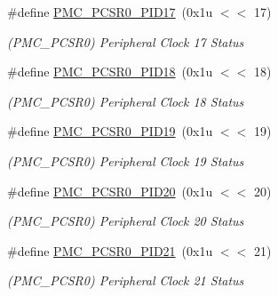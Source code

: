 \begin{DoxyCompactItemize}
\mbox{\label{group__SAME70__PMC_ga5f42d67ad6601e60109af27d2eb91f2f}} 
\#define \mbox{\hyperlink{group__SAME70__PMC_ga5f42d67ad6601e60109af27d2eb91f2f}{P\+M\+C\+\_\+\+P\+C\+S\+R0\+\_\+\+P\+I\+D17}}~(0x1u $<$$<$ 17)
\begin{DoxyCompactList}\small\item\em (P\+M\+C\+\_\+\+P\+C\+S\+R0) Peripheral Clock 17 Status \end{DoxyCompactList}\item 
\mbox{\label{group__SAME70__PMC_ga703eff24f099c4efae05d4a0506798a8}} 
\#define \mbox{\hyperlink{group__SAME70__PMC_ga703eff24f099c4efae05d4a0506798a8}{P\+M\+C\+\_\+\+P\+C\+S\+R0\+\_\+\+P\+I\+D18}}~(0x1u $<$$<$ 18)
\begin{DoxyCompactList}\small\item\em (P\+M\+C\+\_\+\+P\+C\+S\+R0) Peripheral Clock 18 Status \end{DoxyCompactList}\item 
\mbox{\label{group__SAME70__PMC_gaee2fed0a8f85d8b1d61d2f39548705f8}} 
\#define \mbox{\hyperlink{group__SAME70__PMC_gaee2fed0a8f85d8b1d61d2f39548705f8}{P\+M\+C\+\_\+\+P\+C\+S\+R0\+\_\+\+P\+I\+D19}}~(0x1u $<$$<$ 19)
\begin{DoxyCompactList}\small\item\em (P\+M\+C\+\_\+\+P\+C\+S\+R0) Peripheral Clock 19 Status \end{DoxyCompactList}\item 
\mbox{\label{group__SAME70__PMC_ga2ac7444ae97845536c9af7cd365c3289}} 
\#define \mbox{\hyperlink{group__SAME70__PMC_ga2ac7444ae97845536c9af7cd365c3289}{P\+M\+C\+\_\+\+P\+C\+S\+R0\+\_\+\+P\+I\+D20}}~(0x1u $<$$<$ 20)
\begin{DoxyCompactList}\small\item\em (P\+M\+C\+\_\+\+P\+C\+S\+R0) Peripheral Clock 20 Status \end{DoxyCompactList}\item 
\mbox{\label{group__SAME70__PMC_ga00f250bdc8809d1c713a62a87af554bf}} 
\#define \mbox{\hyperlink{group__SAME70__PMC_ga00f250bdc8809d1c713a62a87af554bf}{P\+M\+C\+\_\+\+P\+C\+S\+R0\+\_\+\+P\+I\+D21}}~(0x1u $<$$<$ 21)
\begin{DoxyCompactList}\small\item\em (P\+M\+C\+\_\+\+P\+C\+S\+R0) Peripheral Clock 21 Status \end{DoxyCompactList}\item 
$$
\end{DoxyCompactItemize}
